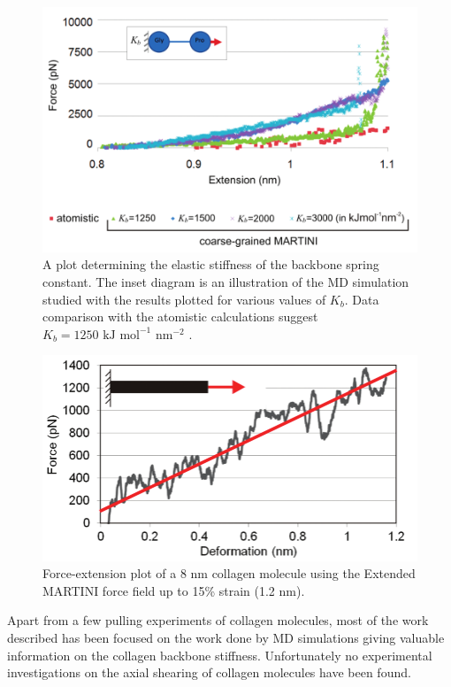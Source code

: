 \begin{figure}[H]
\centering
\centering\includegraphics[scale=0.3]{Graphics/Collagen/Gautieri_2010_fig2_combined.png}
\caption{A plot determining the elastic stiffness of the backbone spring constant. The inset diagram is an illustration of the MD simulation studied with the results plotted for various values of $K_{b}$. Data comparison with the atomistic calculations suggest $K_{b} = 1250 \text{ kJ mol}^{-1} \text{ nm}^{-2}$ \cite{Gautieri2010}.} 
\label{fig:gautieri_backbone}
\end{figure}

\begin{figure}[H]
\centering
\label{fig:}\centering\includegraphics[scale=0.3]{Graphics/Collagen/Gautieri_2010_fig4a.png}
\caption{Force-extension plot of a $8 \text{ nm}$ collagen molecule using the Extended MARTINI force field up to 15\% strain (1.2 nm).} 
\label{fig:gautieri_results}
\end{figure}

Apart from a few pulling experiments of collagen molecules, most of the work described has been focused on the work done by MD simulations giving valuable information on the collagen backbone stiffness. Unfortunately no experimental investigations on the axial shearing of collagen molecules have been found.
